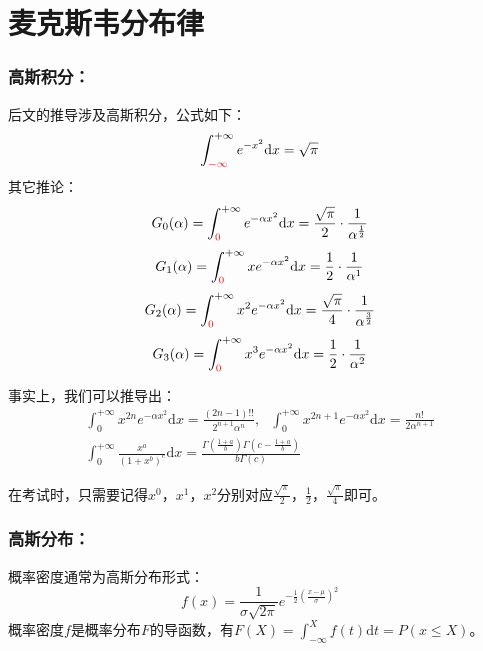 \documentclass[zihao=-4,UTF8]{report}
\begin{document}
\section{麦克斯韦分布律}
\subsubsection{高斯积分：}
后文的推导涉及高斯积分，公式如下：
\begin{equation}
    \int_{\textcolor{red}{-\infty}}^{+\infty}e^{-x^2}\mathrm{d}x = \sqrt{\pi}
\end{equation}
其它推论：
\begin{equation}
    G_0(\alpha) = \int_{\textcolor{red}{0}}^{+\infty} e^{-\alpha x^2}\mathrm{d}x = \frac{\sqrt{\pi }}{2}\cdot \frac{1}{\alpha^{\frac{1}{2}}}
\end{equation}
\begin{equation}
    G_1(\alpha) = \int_{\textcolor{red}{0}}^{+\infty} xe^{-\alpha x^2}\mathrm{d}x = \frac{1}{2}\cdot \frac{1}{\alpha^1}
\end{equation}
\begin{equation}
    G_2(\alpha) = \int_{\textcolor{red}{0}}^{+\infty} x^2e^{-\alpha x^2}\mathrm{d}x = \frac{\sqrt{\pi }}{4}\cdot \frac{1}{\alpha^{\frac{3}{2}}}
\end{equation}
\begin{equation}
    G_3(\alpha) = \int_{\textcolor{red}{0}}^{+\infty} x^3e^{-\alpha x^2}\mathrm{d}x = \frac{1}{2}\cdot \frac{1}{\alpha^2}
\end{equation}\par 
{\color{gray}\small 事实上，我们可以推导出：
\begin{gather}
    \int_{0}^{+\infty }x^{2n}e^{-\alpha x^2}\mathrm{d}x = \frac{(2n-1)!!}{2^{n+1}\alpha^n},\ \ \ \int_{0}^{+\infty} x^{2n+1}e^{-\alpha x^2}\mathrm{d}x = \frac{n!}{2\alpha^{n+1}}\\
    \int_{0}^{+\infty } \frac{x^a}{(1+x^b)^c}\mathrm{d}x = \frac{\Gamma(\frac{1+a}{b})\Gamma(c-\frac{1+a}{b})}{b\Gamma(c)}
\end{gather}\par
在考试时，只需要记得$x^0$，$x^1$，$x^2$分别对应$\frac{\sqrt{\pi}}{2}$，$\frac{1}{2}$，$\frac{\sqrt{ \pi}}{4}$即可。
}
\subsubsection{高斯分布：}
概率密度通常为高斯分布形式：
\begin{equation}
    f(x) = \frac{1}{\sigma\sqrt{2\pi }}e^{-\frac{1}{2}\left(\frac{x-\mu }{\sigma}\right)^2}
\end{equation}
{\color{gray}\small 概率密度$f$是概率分布$F$的导函数，有$F(X) = \int_{-\infty}^{X} f(t)\mathrm{d}t = P(x \le X)$。}
\end{document}
